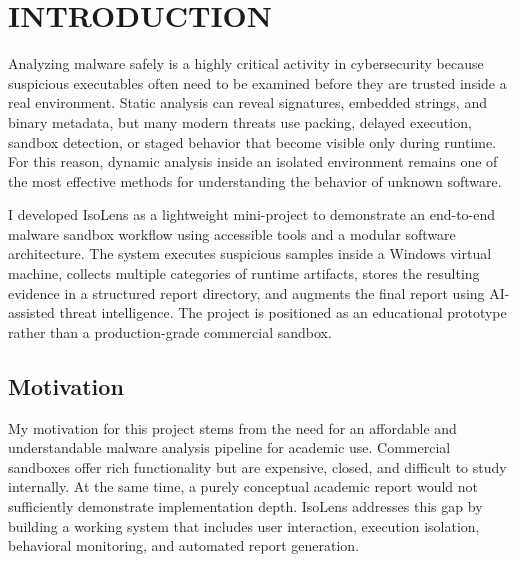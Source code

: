 \documentclass[a4paper,12pt,oneside]{report}
\newcommand{\changefont}{%
\fontsize{10}{12}\selectfont
}
\begin{document}
\newpage


\newpage
\renewcommand\thepage{\arabic{page}}
\clearpage
\setlength{\headheight}{15pt}
\pagestyle{fancy}
\fancyhf{}
\lhead{\changefont\thechapter.\leftmark}
\rhead{}
\cfoot{\thepage}
\renewcommand{\chaptermark}[1]{\markboth{#1}{}}
\renewcommand{\sectionmark}[1]{\markright{#1}{}}
\renewcommand{\headrulewidth}{0.5pt}
\setcounter{page}{1}

\chapter{INTRODUCTION}
\noindent
Analyzing malware safely is a highly critical activity in cybersecurity because suspicious executables often need to be examined before they are trusted inside a real environment. Static analysis can reveal signatures, embedded strings, and binary metadata, but many modern threats use packing, delayed execution, sandbox detection, or staged behavior that become visible only during runtime. For this reason, dynamic analysis inside an isolated environment remains one of the most effective methods for understanding the behavior of unknown software.

\par

\par

I developed IsoLens as a lightweight mini-project to demonstrate an end-to-end malware sandbox workflow using accessible tools and a modular software architecture. The system executes suspicious samples inside a Windows virtual machine, collects multiple categories of runtime artifacts, stores the resulting evidence in a structured report directory, and augments the final report using AI-assisted threat intelligence. The project is positioned as an educational prototype rather than a production-grade commercial sandbox.

\section{Motivation}
\noindent
My motivation for this project stems from the need for an affordable and understandable malware analysis pipeline for academic use. Commercial sandboxes offer rich functionality but are expensive, closed, and difficult to study internally. At the same time, a purely conceptual academic report would not sufficiently demonstrate implementation depth. IsoLens addresses this gap by building a working system that includes user interaction, execution isolation, behavioral monitoring, and automated report generation.
\end{document}
